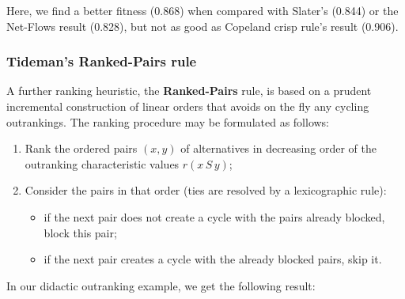 \documentclass[letterpaper,10pt,english]{sphinxmanual}
\begin{document}
Here, we find a better fitness (0.868) when compared with Slater's (0.844) or the Net-Flows result (0.828), but not as good as Copeland crisp rule's result (0.906).


\subsubsection{Tideman's Ranked-Pairs rule}
\label{tutorial:tideman-s-ranked-pairs-rule}
A further ranking heuristic, the \textbf{Ranked-Pairs} rule, is based on a prudent incremental construction of linear orders that avoids on the fly any cycling outrankings. The ranking procedure may be formulated as follows:
\begin{enumerate}
\item {} 
Rank the ordered pairs \((x,y)\) of alternatives in decreasing order of the outranking characteristic values \(r(x\,S\,y)\);

\item {} 
Consider the pairs in that order (ties are resolved by a lexicographic rule):
\begin{itemize}
\item {} 
if the next pair does not create a cycle with the pairs already blocked, block this pair;

\item {} 
if the next pair creates a cycle with the already blocked pairs, skip it.

\end{itemize}

\end{enumerate}

In our didactic outranking example, we get the following result:
\end{document}
